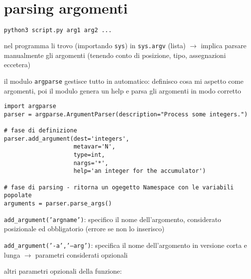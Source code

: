 \section{parsing argomenti}

\begin{lstlisting}[language=bash]
python3 script.py arg1 arg2 ...
\end{lstlisting}

nel programma li trovo (importando \texttt{sys}) in \texttt{sys.argv} (lista) $\rightarrow$ implica parsare manualmente gli argomenti (tenendo conto di posizione, tipo, assegnazioni eccetera)

il modulo \texttt{argparse} gestisce tutto in automatico: definisco cosa mi aspetto come argomenti, poi il modulo genera un help e parsa gli argomenti in modo corretto

\begin{verbatim}
import argparse
parser = argparse.ArgumentParser(description="Process some integers.")

# fase di definizione
parser.add_argument(dest='integers',
                    metavar='N',
                    type=int,
                    nargs='*',
                    help='an integer for the accumulator')

# fase di parsing - ritorna un ogegetto Namespace con le variabili popolate
arguments = parser.parse_args()
\end{verbatim}

\texttt{add_argument('argname')}: specifico il nome dell'argomento, considerato posizionale ed obbligatorio (errore se non lo inserisco)

\texttt{add_argument('-a','--arg')}: specifica il nome dell'argomento in versione corta e lunga $\rightarrow$ parametri considerati opzionali

altri parametri opzionali della funzione:

